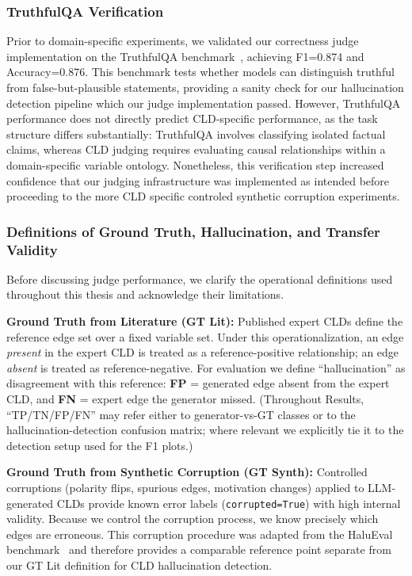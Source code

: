 \subsubsection{TruthfulQA Verification}

Prior to domain-specific experiments, we validated our correctness judge implementation on the TruthfulQA benchmark~\citep{lin2022truthfulqa}, achieving F1=0.874 and Accuracy=0.876. This benchmark tests whether models can distinguish truthful from false-but-plausible statements, providing a sanity check for our hallucination detection pipeline which our judge implementation passed. However, TruthfulQA performance does not directly predict CLD-specific performance, as the task structure differs substantially: TruthfulQA involves classifying isolated factual claims, whereas CLD judging requires evaluating causal relationships within a domain-specific variable ontology. Nonetheless, this verification step increased confidence that our judging infrastructure was implemented as intended before proceeding to the more CLD specific controled synthetic corruption experiments.

\subsubsection{Definitions of Ground Truth, Hallucination, and Transfer Validity}

Before discussing judge performance, we clarify the operational definitions used throughout this thesis and acknowledge their limitations.

\textbf{Ground Truth from Literature (GT Lit):} Published expert CLDs define the reference edge set over a fixed variable set. Under this operationalization, an edge \textit{present} in the expert CLD is treated as a reference-positive relationship; an edge \textit{absent} is treated as reference-negative. For evaluation we define ``hallucination'' as disagreement with this reference: \textbf{FP} = generated edge absent from the expert CLD, and \textbf{FN} = expert edge the generator missed. (Throughout Results, ``TP/TN/FP/FN'' may refer either to generator-vs-GT classes or to the hallucination-detection confusion matrix; where relevant we explicitly tie it to the detection setup used for the F1 plots.)

\textbf{Ground Truth from Synthetic Corruption (GT Synth):} Controlled corruptions (polarity flips, spurious edges, motivation changes) applied to LLM-generated CLDs provide known error labels (\texttt{corrupted=True}) with high internal validity. Because we control the corruption process, we know precisely which edges are erroneous. This corruption procedure was adapted from the HaluEval benchmark~\citep{li2023halueval} and therefore provides a comparable reference point separate from our GT Lit definition for CLD hallucination detection.

